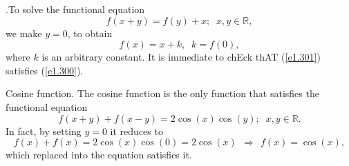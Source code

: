 \documentclass[
	11pt, %
	fleqn, %
	a4paper, %
]{LegrandOrangeBook}
\newcommand{\R}{\mathbb{R}}
\begin{document}
\begin{example}.To solve the functional equation
\begin{equation}\label{e1.300}
f(x+y)=f(y)+x;\;\;x,y\in \R ,
\end{equation}
we make $y=0$, to obtain
\begin{equation}\label{e1.301}
f(x)=x+k,\;\;k=f(0),
\end{equation}
where $k$ is an arbitrary constant. It is immediate to chEck thAT (\ref{e1.301}) satisfies (\ref{e1.300}).
\end{example}

\begin{example}{Cosine function.}\label{cos11} The cosine function is the only
function that
satisfies the functional equation
\begin{displaymath}
f(x+y)+f(x-y)=2 \cos (x) \cos (y);\;\;x,y \in \R.
\end{displaymath}
In fact, by setting $y=0$ it reduces to
\begin{displaymath}
f(x)+f(x)=2 \cos (x) \cos (0)= 2 \cos (x) \ \ \Rightarrow \ \ f(x)= \cos (x),
\end{displaymath}
which replaced into the equation satisfies it.
\end{example}
\end{document}
